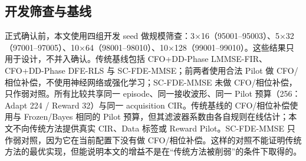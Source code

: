 \subsection{开发筛查与基线}

正式确认前，本文使用四组开发 seed 做规模筛查：3×16（95001–95003）、5×32（97001–97005）、10×64（98001–98010）、10×128（99001–99010）。这些结果只用于设计，不并入确认。传统基线包括 CFO+DD-Phase LMMSE-FIR、CFO+DD-Phase DFE-RLS 与 SC-FDE-MMSE；前两者使用合法 Pilot 做 CFO/相位补偿，不使用神经网络或强化学习；SC-FDE-MMSE 未做 CFO/相位补偿，只作弱对照。所有比较共享同一 episode、同一接收波形、同一 Pilot 预算（256：Adapt 224 / Reward 32）与同一 acquisition CIR。传统基线的 CFO/相位补偿使用与 Frozen/Bayes 相同的 Pilot 预算，但其滤波器系数由各自规则在线估计；本文不向传统方法提供真实 CIR、Data 标签或 Reward Pilot。SC-FDE-MMSE 只作弱对照，因为它在当前配置下没有做 CFO/相位补偿。这样的对照不能证明传统方法的最优实现，但能说明本文的增益不是在“传统方法被削弱”的条件下取得的。
